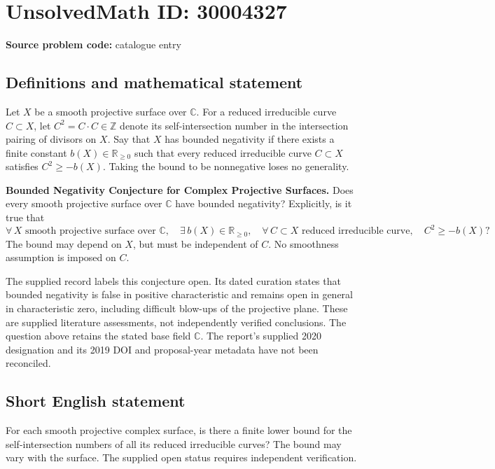 \documentclass[11pt]{article}
\newcommand{\Z}{\mathbb{Z}}
\newcommand{\R}{\mathbb{R}}
\newcommand{\C}{\mathbb{C}}
\begin{document}
\section*{UnsolvedMath ID: 30004327}
\textbf{Source problem code:} catalogue entry
\subsection{Definitions and mathematical statement}
Let \(X\) be a smooth projective surface over \(\C\). For a reduced irreducible curve \(C\subset X\), let \(C^2=C\cdot C\in\Z\) denote its self-intersection number in the intersection pairing of divisors on \(X\). Say that \(X\) has bounded negativity if there exists a finite constant \(b(X)\in\R_{\geq 0}\) such that every reduced irreducible curve \(C\subset X\) satisfies \(C^2\geq-b(X)\). Taking the bound to be nonnegative loses no generality.

\textbf{Bounded Negativity Conjecture for Complex Projective Surfaces.} Does every smooth projective surface over \(\C\) have bounded negativity? Explicitly, is it true that
\[
\forall\,X\text{ smooth projective surface over }\C,\quad
\exists\,b(X)\in\R_{\geq0},\quad
\forall\,C\subset X\text{ reduced irreducible curve},\quad
C^2\geq-b(X)?
\]
The bound may depend on \(X\), but must be independent of \(C\). No smoothness assumption is imposed on \(C\).

The supplied record labels this conjecture open. Its dated curation states that bounded negativity is false in positive characteristic and remains open in general in characteristic zero, including difficult blow-ups of the projective plane. These are supplied literature assessments, not independently verified conclusions. The question above retains the stated base field \(\C\). The report's supplied 2020 designation and its 2019 DOI and proposal-year metadata have not been reconciled.
\subsection{Short English statement}
For each smooth projective complex surface, is there a finite lower bound for the self-intersection numbers of all its reduced irreducible curves? The bound may vary with the surface. The supplied open status requires independent verification.
\end{document}
